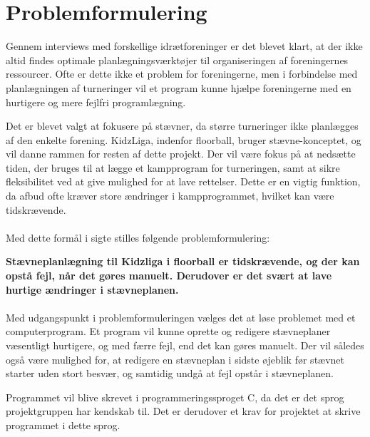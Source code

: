 \chapter{Problemformulering}\label{ch:chlabel}
Gennem interviews med forskellige idrætforeninger er det blevet klart, at der ikke altid findes optimale planlægningsværktøjer til organiseringen af foreningernes ressourcer. Ofte er dette ikke et problem for foreningerne, men i forbindelse med planlægningen af turneringer vil et program kunne hjælpe foreningerne med en hurtigere og mere fejlfri programlægning.
\par
Det er blevet valgt at fokusere på stævner, da større turneringer ikke planlægges af den enkelte forening. KidzLiga, indenfor floorball, bruger stævne-konceptet, og vil danne rammen for resten af dette projekt. Der vil være fokus på at nedsætte tiden, der bruges til at lægge et kampprogram for turneringen, samt at sikre fleksibilitet ved at give mulighed for at lave rettelser. Dette er en vigtig funktion, da afbud ofte kræver store ændringer i kampprogrammet, hvilket kan være tidskrævende.
\\\\
Med dette formål i sigte stilles følgende problemformulering:
\par
\textbf{Stævneplanlægning til Kidzliga i floorball er tidskrævende, og der kan opstå fejl, når det gøres manuelt. Derudover er det svært at lave hurtige ændringer i stævneplanen.}
\\\\
Med udgangspunkt i problemformuleringen vælges det at løse problemet med et computerprogram. Et program vil kunne oprette og redigere stævneplaner væsentligt hurtigere, og med færre fejl, end det kan gøres manuelt. Der vil således også være mulighed for, at redigere en stævneplan i sidste øjeblik før stævnet starter uden stort besvær, og samtidig undgå at fejl opstår i stævneplanen.
\par
Programmet vil blive skrevet i programmeringssproget C, da det er det sprog projektgruppen har kendskab til. Det er derudover et krav for projektet at skrive programmet i dette sprog.





















